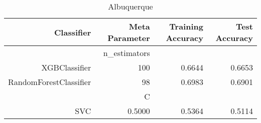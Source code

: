 
\begin{table}[H]
    \caption{Albuquerque}
    \centering
    \begin{tabular}{|r|r|r|r|}
        \hline
        Classifier &Meta Parameter &Training Accuracy
        &Test Accuracy\\
        \hline
        &n\_estimators &\multicolumn{2}{|r|}{}\\
        \hline
        XGBClassifier &100 &0.6644 &0.6653\\
        \hline
        RandomForestClassifier &98 &0.6983 &0.6901\\
        \hline
        &C &\multicolumn{2}{|r|}{}\\
        \hline
        SVC &0.5000 &0.5364 &0.5114\\
        \hline
    \end{tabular}
\end{table}
